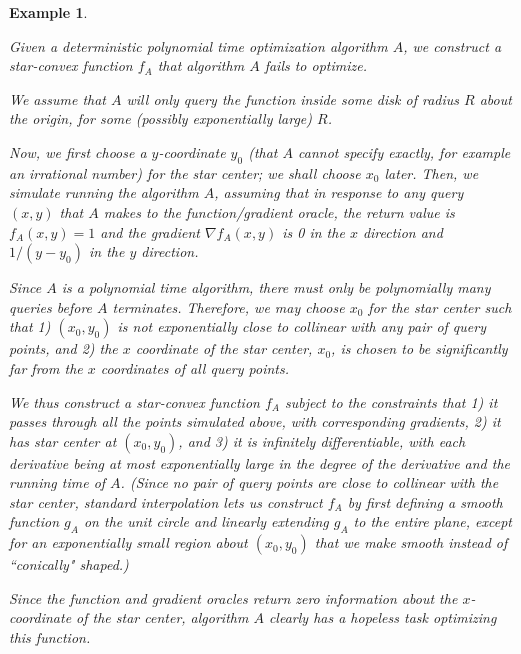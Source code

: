 \documentclass[11pt,letter]{article}
\newcommand{\Grad}{\nabla}
\newcounter{nTheorems}
\numberwithin{nTheorems}{section}
\newtheorem{example}[nTheorems]{Example}
\begin{document}
\begin{example}\label{ex:deterministic}

Given a deterministic polynomial time optimization algorithm $A$, we construct a star-convex function $f_A$ that algorithm $A$ fails to optimize.

We assume that $A$ will only query the function inside some disk of radius $R$ about the origin, for some (possibly exponentially large) $R$.

Now, we first choose a $y$-coordinate $y_0$ (that $A$ cannot specify exactly, for example an irrational number) for the star center; we shall choose $x_0$ later.
Then, we simulate running the algorithm $A$, assuming that in response to any query $(x,y)$ that $A$ makes to the function/gradient oracle, the return value is $f_A(x, y)=1$ and the gradient $\Grad f_A(x, y)$ is 0 in the $x$ direction and $1/(y-y_0)$ in the $y$ direction.

Since $A$ is a polynomial time algorithm, there must only be polynomially many queries before $A$ terminates.
Therefore, we may choose $x_0$ for the star center such that 1) $(x_0, y_0)$ is not exponentially close to collinear with any pair of query points, and 2) the $x$ coordinate of the star center, $x_0$, is chosen to be significantly far from the $x$ coordinates of all query points.

We thus construct a star-convex function $f_A$ subject to the constraints that 1) it passes through all the points simulated above, with corresponding gradients, 2) it has star center at $(x_0,y_0)$, and 3) it is infinitely differentiable, with each derivative being at most exponentially large in the degree of the derivative and the running time of $A$. (Since no pair of query points are close to collinear with the star center, standard interpolation lets us construct $f_A$ by first defining a smooth function $g_A$ on the unit circle and linearly extending $g_A$ to the entire plane, except for an exponentially small region about $(x_0,y_0)$ that we make smooth instead of ``conically" shaped.)

Since the function and gradient oracles return zero information about the $x$-coordinate of the star center, algorithm $A$ clearly has a hopeless task optimizing this function.


\end{example}
\end{document}
